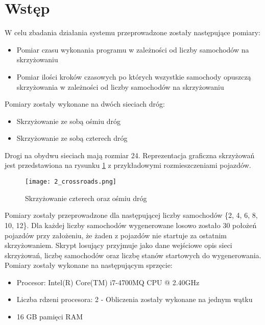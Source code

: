 \label{chap:outcomes}

\section{Wstęp}

W celu zbadania działania systemu przeprowadzone zostały następujące pomiary:
\begin{itemize}
\item Pomiar czasu wykonania programu w zależności od liczby samochodów na skrzyżowaniu 
\item Pomiar ilości kroków czasowych po których wszystkie samochody opuszczą skrzyżowania w zależności od liczby samochodów na skrzyżowaniu
\end{itemize}

Pomiary zostały wykonane na dwóch sieciach dróg:
\begin{itemize}
\item Skrzyżowanie ze sobą ośmiu dróg
\item Skrzyżowanie ze sobą czterech dróg
\end{itemize}

Drogi na obydwu sieciach mają rozmiar 24. Reprezentacja graficzna skrzyżowań jest przedstawiona na rysunku \ref{both-crossroads} z przykładowymi rozmieszczeniami pojazdów.
\begin{figure}[H]
    \texttt{[image: 2\_crossroads.png]}
  \caption{Skrzyżowanie czterech oraz ośmiu dróg}
  \label{both-crossroads}
\end{figure}

Pomiary zostały przeprowadzone dla następującej liczby samochodów \{2, 4, 6, 8, 10, 12\}. Dla każdej liczby samochodów wygenerowane losowo zostało 30 położeń pojazdów przy założeniu, że żaden z pojazdów nie startuje za ostatnim skrzyżowaniem. Skrypt losujący przyjmuje jako dane wejściowe opis sieci skrzyżowań, liczbę samochodów oraz liczbę stanów startowych do wygenerowania.
\newline
\newline
Pomiary zostały wykonane na następującym sprzęcie:
\begin{itemize}
\item Procesor: Intel(R) Core(TM) i7-4700MQ CPU @ 2.40GHz
\item Liczba rdzeni procesora: 2 - Obliczenia zostały wykonane na jednym wątku
\item 16 GB pamięci RAM
\end{itemize}

